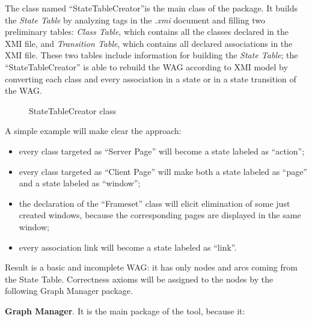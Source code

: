 The class named ``StateTableCreator''is the main class of the package. It builds the \textit{State Table} by analyzing tags in the \textit{.xmi} document and filling two preliminary tables: \textit{Class Table}, which contains all the classes declared in the XMI file, and \textit{Transition Table}, which contains all declared associations in the XMI file. These two tables include information for building the \textit{State Table}; the ``StateTableCreator'' is able to rebuild the WAG according to XMI model by converting each class and every association in a state or in a state transition of the WAG.

\begin{figure}[ht]
\caption{StateTableCreator class \label{fig7}}
\end{figure}

A simple example will make clear the approach:

\footnotesize
\begin{itemize}
	\item every class targeted as ``Server Page'' will become a state labeled as ``action''; 
	\item every class targeted as ``Client Page'' will make both a state labeled as ``page'' and a state labeled as ``window''; 
	\item the declaration of the ``Frameset'' class will elicit elimination of some just created windows, because the corresponding pages are displayed in the same window;  
	\item every association link will become a state labeled as ``link''. 
\end{itemize}

\normalsize
Result is a basic and incomplete WAG: it has only nodes and arcs coming from the State Table. Correctness axioms will be assigned to the nodes by the following Graph Manager package.

\textbf{Graph Manager}. It is the main package of the tool, because it:

